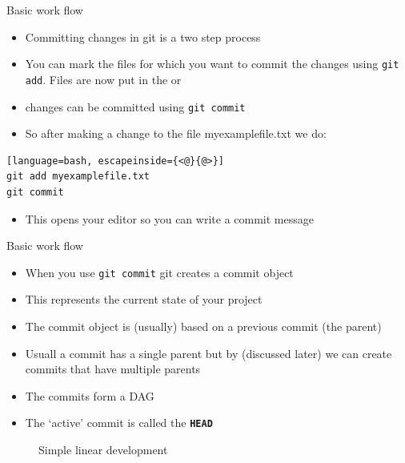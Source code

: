 \documentclass[12pt]{beamer}
\begin{document}
\begin{frame}[fragile]{Basic work flow}
\begin{itemize}
\item Committing changes in git is a two step process 
\item You can mark the files for which you want to commit the changes using \texttt{git add}. Files are now put in the \textbf{} or \textbf{}
\item changes can be committed using \texttt{git commit}
\item So after making a change to the file myexamplefile.txt we do:
\end{itemize}
\begin{lstlisting}[language=bash, escapeinside={<@}{@>}]
git add myexamplefile.txt
git commit
\end{lstlisting}
\begin{itemize}
\item This opens your editor so you can write a commit message
\end{itemize}
\end{frame}


\begin{frame}[fragile]{Basic work flow}
\begin{itemize}
\item When you use \texttt{git commit} git creates a commit object  
\item This represents the current state of your project
\item The commit object is (usually) based on a previous commit (the parent)
\item Usuall a commit has a single parent but by \textbf{} (discussed later) we can create commits that have multiple parents
\item The commits form a DAG
\item The `active' commit is called the \textbf{\texttt{HEAD}}
\end{itemize}

\begin{figure}

    \centering



  \caption{Simple linear development}
\end{figure}
\end{frame}
\end{document}
